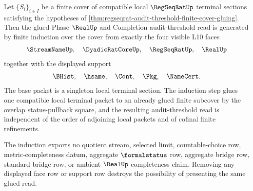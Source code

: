 \begin{theorem}
\label{thm:regseqrat-audit-threshold-four-face-support-induction}
Let $\{S_i\}_{i \in I}$ be a finite cover of compatible local $\RegSeqRatUp$ terminal sections satisfying the hypotheses of \autoref{thm:regseqrat-audit-threshold-finite-cover-gluing}. Then the glued Phase $\RealUp$ and Completion audit-threshold read is generated by finite induction over the cover from exactly the four visible L10 faces
$$
\StreamNameUp,\quad \DyadicRatCoreUp,\quad \RegSeqRatUp,\quad \RealUp
$$
together with the displayed support
$$
\BHist,\quad \hsame,\quad \Cont,\quad \Pkg,\quad \NameCert.
$$
The base packet is a singleton local terminal section. The induction step glues one compatible local terminal packet to an already glued finite subcover by the overlap status-pullback square, and the resulting audit-threshold read is independent of the order of adjoining local packets and of cofinal finite refinements.

The induction exports no quotient stream, selected limit, countable-choice row, metric-completeness datum, aggregate $\formalstatus$ row, aggregate bridge row, standard bridge row, or ambient $\RealUp$ completeness claim. Removing any displayed face row or support row destroys the possibility of presenting the same glued read.
\end{theorem}
